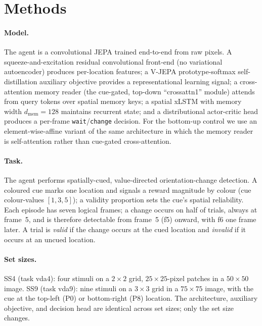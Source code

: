 \section{Methods}

\paragraph{Model.} The agent is a convolutional JEPA trained end-to-end from raw pixels. A squeeze-and-excitation residual convolutional front-end (no variational autoencoder) produces per-location features; a V-JEPA prototype-softmax self-distillation auxiliary objective provides a representational learning signal; a cross-attention memory reader (the cue-gated, top-down ``crossattn1'' module) attends from query tokens over spatial memory keys; a spatial xLSTM with memory width $d_{\mathrm{mem}}=128$ maintains recurrent state; and a distributional actor-critic head produces a per-frame \texttt{wait}/\texttt{change} decision. For the bottom-up control we use an element-wise-affine variant of the same architecture in which the memory reader is self-attention rather than cue-gated cross-attention.

\paragraph{Task.} The agent performs spatially-cued, value-directed orientation-change detection. A coloured cue marks one location and signals a reward magnitude by colour (cue colour-values $[1,3,5]$); a validity proportion sets the cue's spatial reliability. Each episode has seven logical frames; a change occurs on half of trials, always at frame~5, and is therefore detectable from frame~5 (f5) onward, with f6 one frame later. A trial is \emph{valid} if the change occurs at the cued location and \emph{invalid} if it occurs at an uncued location.

\paragraph{Set sizes.} SS4 (task vda4): four stimuli on a $2\times2$ grid, $25\times25$-pixel patches in a $50\times50$ image. SS9 (task vda9): nine stimuli on a $3\times3$ grid in a $75\times75$ image, with the cue at the top-left (P0) or bottom-right (P8) location. The architecture, auxiliary objective, and decision head are identical across set sizes; only the set size changes.

